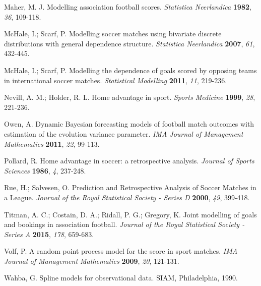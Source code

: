 \documentclass[journal,article,accept,moreauthors,pdftex,12pt,a4paper]{mdpi}
\begin{document}
\begin{thebibliography}{999}
			Maher, M. J. Modelling association football scores. {\em Statistica Neerlandica} {\bf 1982}, {\em 36}, 109-118.
			
			McHale, I.; Scarf, P. Modelling soccer matches using bivariate
			discrete distributions with general dependence structure. {\em
				Statistica Neerlandica} {\bf 2007}, {\em 61}, 432-445.
			
			McHale, I.; Scarf, P. Modelling the dependence of goals scored by
			opposing teams in international soccer matches. {\em Statistical
				Modelling} {\bf 2011}, {\em 11}, 219-236.
			
			Nevill, A. M.; Holder, R. L. Home advantage in sport. {\em Sports
				Medicine} {\bf 1999}, {\em 28}, 221-236.
			
			Owen, A. Dynamic Bayesian forecasting models of football match
			outcomes with estimation of the evolution variance parameter. {\em
				IMA Journal of Management Mathematics} {\bf 2011}, {\em 22}, 99-113.
			
			Pollard, R. Home advantage in soccer: a retrospective analysis. {\em Journal of Sports Sciences} {\bf 1986}, {\em 4}, 237-248.
			
			Rue, H.; Salvesen, O. Prediction and Retrospective Analysis of
			Soccer Matches in a League. {\em Journal of the Royal Statistical
				Society - Series D} {\bf 2000}, {\em 49}, 399-418.
			
			Titman, A. C.; Costain, D. A.; Ridall, P. G.; Gregory, K. Joint
			modelling of goals and bookings in association football. {\em
				Journal of the Royal Statistical Society - Series A} {\bf 2015},
			{\em 178}, 659-683.
			
			Volf, P. A random point process model for the score in sport
			matches. {\em IMA Journal of Management Mathematics} {\bf 2009},
			{\em 20}, 121-131.
			
			Wahba, G. Spline models for observational data. SIAM, Philadelphia,
			1990.
			
		\end{thebibliography}
		
		
		
		
		
		
		
		
		
	
\end{document}
